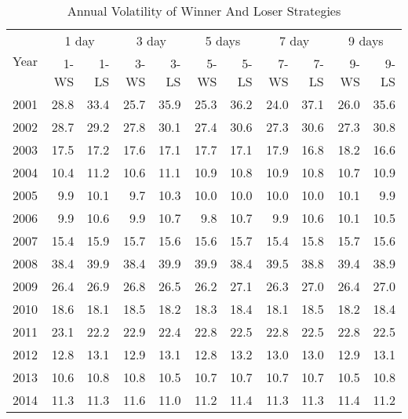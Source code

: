 \documentclass{article}
\begin{document}
\begin{table}[!ht]
    \centering
    \caption{Annual Volatility of Winner And Loser Strategies}
    \medskip
\begin{tabular}{l| rr | rr| rr| rr| rr}
\hline
\multirow{2}{*}{Year} & \multicolumn{2}{c|}{1 day}   
& \multicolumn{2}{c|}{3 day}  & \multicolumn{2}{c|}{5 days}   
& \multicolumn{2}{c|}{7 day}   & \multicolumn{2}{c}{9 days}\\
 & 1-WS & 1-LS & 3-WS & 3-LS & 5-WS & 5-LS & 7-WS & 7-LS & 9-WS & 9-LS \\
\hline
2001 & 28.8 & 33.4 & 25.7 & 35.9 & 25.3 & 36.2 & \cellcolor{red!25}24.0 & \cellcolor{green!25}37.1 & 26.0 & 35.6 \\
2002 & 28.7 & 29.2 & 27.8 & 30.1 & 27.4 & 30.6 & 27.3 & 30.6 & \cellcolor{red!25}27.3 & \cellcolor{green!25}30.8 \\
2003 & 17.5 & 17.2 & 17.6 & 17.1 & 17.7 & 17.1 & 17.9 & 16.8 & \cellcolor{green!25}18.2 & \cellcolor{red!25}16.6 \\
2004 & \cellcolor{red!25}10.4 & \cellcolor{green!25}11.2 & 10.6 & 11.1 & 10.9 & 10.8 & 10.9 & 10.8 & 10.7 & 10.9 \\
2005 & 9.9 & 10.1 & \cellcolor{red!25}9.7 & \cellcolor{green!25}10.3 & 10.0 & 10.0 & 10.0 & 10.0 & 10.1 & 9.9 \\
2006 & 9.9 & 10.6 & 9.9 & 10.7 & \cellcolor{red!25}9.8 & \cellcolor{green!25}10.7 & 9.9 & 10.6 & 10.1 & 10.5 \\
2007 & \cellcolor{red!25}15.4 & \cellcolor{green!25}15.9 & 15.7 & 15.6 & 15.6 & 15.7 & 15.4 & 15.8 & 15.7 & 15.6 \\
2008 & 38.4 & 39.9 & \cellcolor{red!25}38.4 & \cellcolor{green!25}39.9 & 39.9 & 38.4 & 39.5 & 38.8 & 39.4 & 38.9 \\
2009 & 26.4 & 26.9 & 26.8 & 26.5 & \cellcolor{red!25}26.2 & \cellcolor{green!25}27.1 & 26.3 & 27.0 & 26.4 & 27.0 \\
2010 & \cellcolor{green!25}18.6 & \cellcolor{red!25}18.1 & 18.5 & 18.2 & 18.3 & 18.4 & 18.1 & 18.5 & 18.2 & 18.4 \\
2011 & \cellcolor{green!25}23.1 & \cellcolor{red!25}22.2 & 22.9 & 22.4 & 22.8 & 22.5 & 22.8 & 22.5 & 22.8 & 22.5 \\
2012 & 12.8 & 13.1 & 12.9 & 13.1 & \cellcolor{red!25}12.8 & \cellcolor{green!25}13.2 & 13.0 & 13.0 & 12.9 & 13.1 \\
2013 & 10.6 & 10.8 & \cellcolor{green!25}10.8 & \cellcolor{red!25}10.5 & 10.7 & 10.7 & 10.7 & 10.7 & 10.5 & 10.8 \\
2014 & 11.3 & 11.3 & \cellcolor{green!25}11.6 & \cellcolor{red!25}11.0 & 11.2 & 11.4 & 11.3 & 11.3 & 11.4 & 11.2 \\

\end{tabular}
\end{table}
\end{document}
